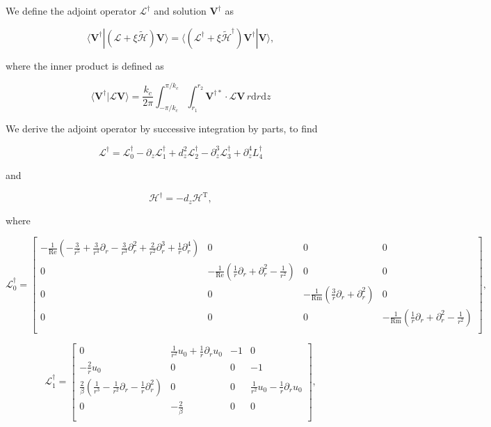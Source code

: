 \documentclass{emulateapj}
\newcommand{\beq}{\begin{equation}}
\newcommand{\eeq}{\end{equation}}
\newcommand\reye{\mathrm{Re}}
\newcommand\reym{\mathrm{Rm}}
\begin{document}
We define the adjoint operator $\mathcal{L}^\dagger$ and solution $\mathbf{V}^\dagger$ as 

\beq
\langle \mathbf{V^\dagger} | (\mathcal{L} + \xi \widetilde{\mathcal{H}}) \mathbf{V} \rangle = \langle (\mathcal{L}^\dagger + \xi \widetilde{\mathcal{H}}^\dagger) \mathbf{V}^\dagger | \mathbf{V} \rangle,
\eeq

where the inner product is defined as 

\beq\label{eq:inner_product_def}
\langle \mathbf{V^\dagger} | \mathcal{L} \mathbf{V} \rangle = \frac{k_c}{2\pi} \int_{-\pi/k_c}^{\pi/k_c} \int_{r_1}^{r_2} \mathbf{V}^{\dagger*} \cdot \mathcal{L} \mathbf{V} \, r \mathrm{d} r \mathrm{d} z
\eeq

We derive the adjoint operator by successive integration by parts, to find 

\beq
\mathcal{L}^\dagger = \mathcal{L}_0^\dagger - \partial_z \mathcal{L}_1^\dagger + d_z^2 \mathcal{L}_2^\dagger - \partial_z^3 \mathcal{L}_3^\dagger + \partial_z^4 L_4^\dagger
\eeq

and 

\beq
\mathcal{H}^\dagger = - d_z \mathcal{H}^\mathrm{T},
\eeq

where 

\beq
\mathcal{L}_0^\dagger = \left[\begin{matrix}
-\frac{1}{\reye} (-\frac{3}{r^5} + \frac{3}{r^4}\partial_r - \frac{3}{r^3} \partial_r^2 + \frac{2}{r^2}\partial_r^3 + \frac{1}{r}\partial_r^4 ) & 0 & 0 & 0 \\
0 & -\frac{1}{\reye} (\frac{1}{r}\partial_r + \partial_r^2 - \frac{1}{r^2}) & 0 & 0 \\
0 & 0 &-\frac{1}{\reym} (\frac{3}{r}\partial_r + \partial_r^2) & 0 \\
0 & 0 & 0 & -\frac{1}{\reym} (\frac{1}{r}\partial_r + \partial_r^2 - \frac{1}{r^2}) \\
\end{matrix}\right],
\eeq

\beq
\mathcal{L}_1^\dagger = \left[\begin{matrix}
0 & \frac{1}{r^2} u_0 + \frac{1}{r}\partial_r u_0 & -1 & 0 \\
-\frac{2}{r}u_0 & 0 & 0 & -1 \\
\frac{2}{\beta}(\frac{1}{r^3} - \frac{1}{r^2}\partial_r - \frac{1}{r}\partial_r^2) & 0 & 0 & \frac{1}{r^2}u_0 - \frac{1}{r}\partial_r u_0 \\
0 & -\frac{2}{\beta} & 0 & 0 \\
\end{matrix}\right],
\eeq
\end{document}
